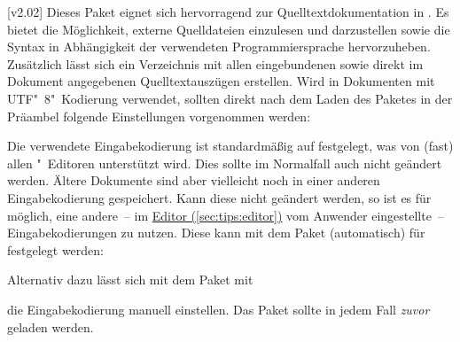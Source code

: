 \begin{DeclarePackages}
[v2.02]
  Dieses Paket eignet sich hervorragend zur Quelltextdokumentation in 
  . Es bietet die Möglichkeit, externe Quelldateien einzulesen 
  und darzustellen sowie die Syntax in Abhängigkeit der verwendeten 
  Programmiersprache hervorzuheben. Zusätzlich lässt sich ein Verzeichnis mit 
  allen eingebundenen sowie direkt im Dokument angegebenen Quelltextauszügen 
  erstellen. Wird  in Dokumenten mit UTF"~8"~Kodierung 
  verwendet, sollten direkt nach dem Laden des Paketes in der Präambel folgende 
  Einstellungen vorgenommen werden:
  \begin{Code}
  \end{Code}\vspace{-\baselineskip}%
  Die verwendete Eingabekodierung ist standardmäßig auf 
  festgelegt, was von (fast) allen "~Editoren unterstützt wird. 
  Dies sollte im Normalfall auch nicht geändert werden. Ältere Dokumente sind 
  aber vielleicht noch in einer anderen Eingabekodierung gespeichert. Kann 
  diese nicht geändert werden, so ist es für  möglich, eine 
  andere~-- im \hyperref[sec:tips:editor]{Editor (\autoref*{sec:tips:editor})} 
  vom Anwender eingestellte~-- Eingabekodierungen zu nutzen. Diese kann mit dem 
  Paket  (automatisch) für  festgelegt werden:
  \begin{Code}
    \usepackage{selinput}
  \end{Code}\vspace{-\baselineskip}%
  Alternativ dazu lässt sich mit dem Paket  mit
  \vspace{-\baselineskip}%
  die Eingabekodierung manuell einstellen. Das Paket  sollte 
  in jedem Fall \emph{zuvor} geladen werden.
\end{DeclarePackages}



